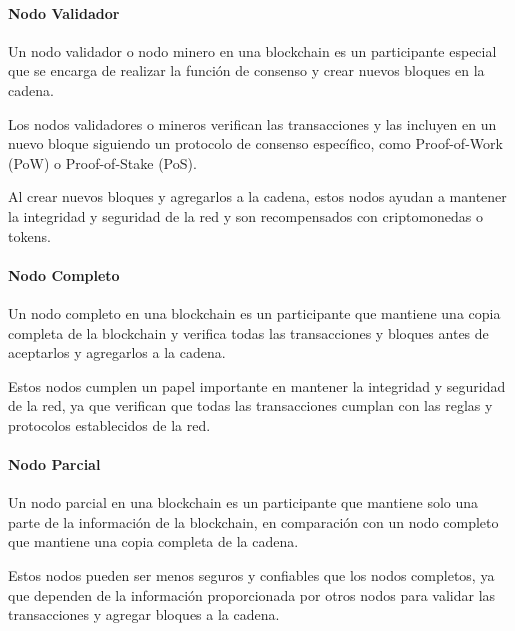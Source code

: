     \paragraph{Nodo Validador}
    
    Un nodo validador o nodo minero en una blockchain es un participante especial que se encarga de realizar la función de consenso y crear nuevos bloques en la cadena. 
    
    \bigskip
    
    Los nodos validadores o mineros verifican las transacciones y las incluyen en un nuevo bloque siguiendo un protocolo de consenso específico, como Proof-of-Work (PoW) o Proof-of-Stake (PoS). 
    
    \bigskip
    
    Al crear nuevos bloques y agregarlos a la cadena, estos nodos ayudan a mantener la integridad y seguridad de la red y son recompensados con criptomonedas o tokens.
    
    \paragraph{Nodo Completo}
    
    Un nodo completo en una blockchain es un participante que mantiene una copia completa de la blockchain y verifica todas las transacciones y bloques antes de aceptarlos y agregarlos a la cadena.
    
    \bigskip
    
    Estos nodos cumplen un papel importante en mantener la integridad y seguridad de la red, ya que verifican que todas las transacciones cumplan con las reglas y protocolos establecidos de la red.
    
    \paragraph{Nodo Parcial}
    
    Un nodo parcial en una blockchain es un participante que mantiene solo una parte de la información de la blockchain, en comparación con un nodo completo que mantiene una copia completa de la cadena.
    
    \bigskip
    
    Estos nodos pueden ser menos seguros y confiables que los nodos completos, ya que dependen de la información proporcionada por otros nodos para validar las transacciones y agregar bloques a la cadena.
    
    \bigskip
    
